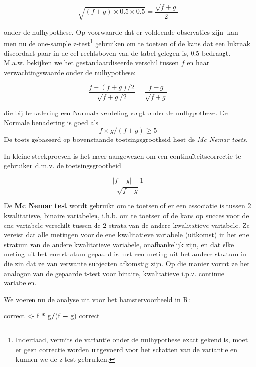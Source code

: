 \documentclass[
  12pt,dutch,coursenotes]{book}
\newenvironment{Shaded}{\begin{snugshade}}{\end{snugshade}}
\newcommand{\NormalTok}[1]{#1}
\newcommand{\OperatorTok}[1]{\textcolor[rgb]{0.81,0.36,0.00}{\textbf{#1}}}
\newcommand{\StringTok}[1]{\textcolor[rgb]{0.31,0.60,0.02}{#1}}
\theoremstyle{definition}
\theoremstyle{definition}
\theoremstyle{definition}
\theoremstyle{remark}
\begin{document}
\begin{equation*}
\sqrt{(f+g)\times 0.5\times 0.5}=\frac{\sqrt{f+g}}{2}
\end{equation*}

onder de nulhypothese. Op voorwaarde dat er voldoende observaties zijn, kan men nu de one-sample z-test\footnote{Inderdaad, vermits de variantie onder de nulhypothese exact gekend is, moet er geen correctie worden uitgevoerd voor het schatten van de variantie en kunnen we de z-test gebruiken.}
gebruiken om te toetsen of de kans dat een lukraak discordant paar in de cel rechtsboven van de tabel
gelegen is, 0.5 bedraagt. M.a.w. bekijken we het gestandaardiseerde verschil
tussen \(f\) en haar verwachtingswaarde onder de nulhypothese:

\begin{equation*}
\frac{f-(f+g)/2}{\sqrt{f+g}/2}=\frac{f-g}{\sqrt{f+g}}
\end{equation*}

die bij benadering een Normale verdeling volgt onder de nulhypothese.
De Normale benadering is goed als \[f \times g/(f+g) \geq 5\]
De toets gebaseerd op bovenstaande toetsingsgrootheid heet de \emph{Mc Nemar toets}.

In kleine steekproeven is het meer aangewezen om een continuïteitscorrectie te gebruiken d.m.v. de toetsingsgrootheid

\begin{equation*}
\frac{|f-g|-1}{\sqrt{f+g}}
\end{equation*}

De \textbf{Mc Nemar test} wordt gebruikt om te toetsen of er een associatie is tussen 2 kwalitatieve, binaire variabelen, i.h.b. om te toetsen of de kans op succes voor de ene variabele verschilt tussen de 2 strata van de andere kwalitatieve variabele. Ze vereist dat alle metingen voor de ene kwalitatieve variabele (uitkomst) in het ene stratum van de andere kwalitatieve variabele, onafhankelijk zijn, en dat elke meting uit het ene stratum gepaard is met een meting uit het andere stratum in die zin dat ze van verwante subjecten afkomstig zijn. Op die manier vormt ze het analogon van de gepaarde t-test voor binaire, kwalitatieve i.p.v. continue variabelen.

We voeren nu de analyse uit voor het hamstervoorbeeld in R:

\begin{Shaded}
\begin{Highlighting}[]
\NormalTok{correct \textless{}{-}}\StringTok{ }\NormalTok{f }\OperatorTok{*}\StringTok{ }\NormalTok{g}\OperatorTok{/}\NormalTok{(f }\OperatorTok{+}\StringTok{ }\NormalTok{g)}
\NormalTok{correct}
\end{Highlighting}
\end{Shaded}
\end{document}
